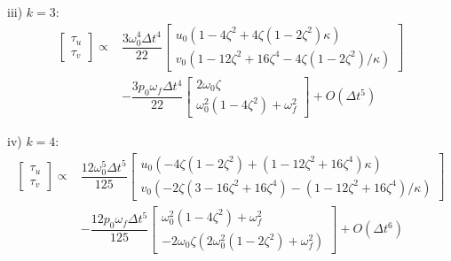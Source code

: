 \documentclass[review]{elsarticle}
\begin{document}
\begin{appendices}
iii) $k=3$:
\begin{equation}
    \begin{array}{ll}
    \begin{bmatrix}
        \tau_{u} \\ \tau_{v}
    \end{bmatrix} \propto &
    \dfrac{3\omega_0^4\Delta t^4}{22}\begin{bmatrix}
        u_0 (1-4\zeta^2+4\zeta(1-2\zeta^2)\kappa) \\
        v_0 (1-12\zeta^2+16\zeta^4-4\zeta(1-2\zeta^2)/\kappa)
    \end{bmatrix} \\
    &-
    \dfrac{3 p_0 \omega_f \Delta t^4}{22}\begin{bmatrix}
        2 \omega_0 \zeta \\
        \omega_0^2 (1 - 4 \zeta^2) + \omega_f^2
    \end{bmatrix}
    + O(\Delta t^5)
    \end{array}
\end{equation}

iv) $k=4$:
\begin{equation}
    \begin{array}{ll}
    \begin{bmatrix}
        \tau_{u} \\ \tau_{v}
    \end{bmatrix} \propto &
    \dfrac{12\omega_0^5\Delta t^5}{125}
    \begin{bmatrix} 
        u_0 (-4\zeta(1-2\zeta^2)+(1-12\zeta^2+16\zeta^4)\kappa) \\
        v_0 (-2\zeta(3-16\zeta^2+16\zeta^4)-(1-12\zeta^2+16\zeta^4)/\kappa)
    \end{bmatrix} \\
    & -\dfrac{12 p_0 \omega_f \Delta t^5}{125}
    \begin{bmatrix} 
        \omega_0^2 (1 -4 \zeta^2) +\omega_f^2 \\
        -2 \omega_0 \zeta(2\omega_0^2 (1 -2\zeta^2)+\omega_f^2)
    \end{bmatrix} 
    + O(\Delta t^6)
    \end{array}
\end{equation}


\end{appendices}
\end{document}
